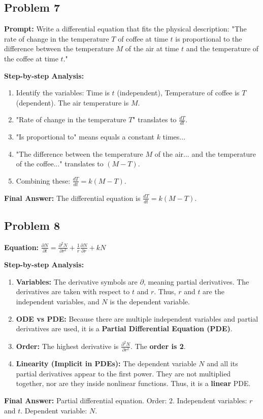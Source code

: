 \documentclass[11pt]{article}
\begin{document}
\subsection*{Problem 7}
\textbf{Prompt:} Write a differential equation that fits the physical description: "The rate of change in the temperature $T$ of coffee at time $t$ is proportional to the difference between the temperature $M$ of the air at time $t$ and the temperature of the coffee at time $t$."
\vspace{0.2cm}

\noindent\textbf{Step-by-step Analysis:}
\begin{enumerate}
    \item Identify the variables: Time is $t$ (independent), Temperature of coffee is $T$ (dependent). The air temperature is $M$.
    \item "Rate of change in the temperature $T$" translates to $\frac{dT}{dt}$.
    \item "Is proportional to" means equals a constant $k$ times...
    \item "The difference between the temperature $M$ of the air... and the temperature of the coffee..." translates to $(M - T)$.
    \item Combining these: $\frac{dT}{dt} = k(M - T)$.
\end{enumerate}
\textbf{Final Answer:} The differential equation is $\frac{dT}{dt} = k(M - T)$.

\subsection*{Problem 8}
\textbf{Equation:} $\frac{\partial N}{\partial t} = \frac{\partial^2 N}{\partial r^2} + \frac{1}{r}\frac{\partial N}{\partial r} + kN$
\vspace{0.2cm}

\noindent\textbf{Step-by-step Analysis:}
\begin{enumerate}
    \item \textbf{Variables:} The derivative symbols are $\partial$, meaning partial derivatives. The derivatives are taken with respect to $t$ and $r$. Thus, $r$ and $t$ are the independent variables, and $N$ is the dependent variable.
    \item \textbf{ODE vs PDE:} Because there are multiple independent variables and partial derivatives are used, it is a \textbf{Partial Differential Equation (PDE)}.
    \item \textbf{Order:} The highest derivative is $\frac{\partial^2 N}{\partial r^2}$. The \textbf{order is 2}.
    \item \textbf{Linearity (Implicit in PDEs):} The dependent variable $N$ and all its partial derivatives appear to the first power. They are not multiplied together, nor are they inside nonlinear functions. Thus, it is a \textbf{linear} PDE.
\end{enumerate}
\textbf{Final Answer:} Partial differential equation. Order: $2$. Independent variables: $r$ and $t$. Dependent variable: $N$.
\end{document}
